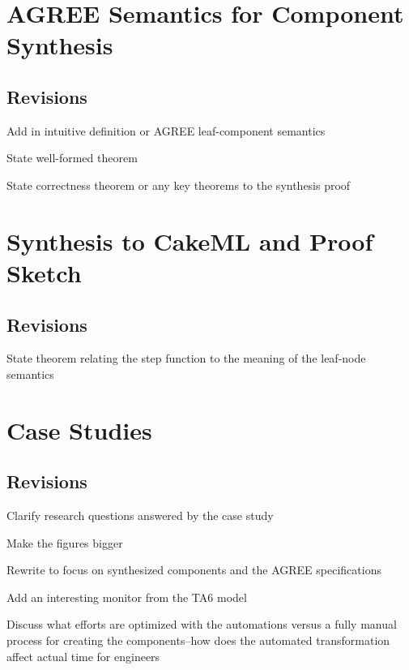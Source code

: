 \documentclass[global,twocolumn]{svjour}
\begin{document}
\section{AGREE Semantics for Component Synthesis}


\subsection{Revisions}
\begin{compactitem}
  \item Add in intuitive definition or AGREE leaf-component semantics
  \item State well-formed theorem
  \item State correctness theorem or any key theorems to the synthesis proof
\end{compactitem}


\section{Synthesis to CakeML and Proof Sketch} \label{sec:synthesis}


\subsection{Revisions}
\begin{compactitem}
  \item State theorem relating the step function to the meaning of the leaf-node semantics
\end{compactitem}

\section{Case Studies} \label{sec:case-study}


\subsection{Revisions}
\begin{compactitem}
  \item Clarify research questions answered by the case study
  \item Make the figures bigger 
  \item Rewrite to focus on synthesized components and the AGREE specifications
  \item Add an interesting monitor from the TA6 model
  \item Discuss what efforts are optimized with the automations versus a fully manual process for creating the components--how does the automated transformation affect actual time for engineers
\end{compactitem}
\end{document}
